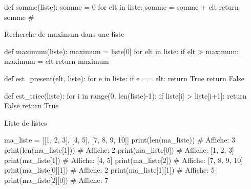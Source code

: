 \begin{minipage}{0.48\linewidth}
\begin{easybox}{}
		\begin{CodePythontexAlt}[Largeur=1\linewidth,Centre,PremLigne=1]{}
def somme(liste):
	somme = 0
	for elt in liste:
		somme = somme + elt
	return somme
#
		\end{CodePythontexAlt}
\end{easybox}
\end{minipage}\hfill
	\begin{minipage}{0.48\linewidth}
		\begin{easybox}{Recherche de maximum dans une liste}{}
	\begin{CodePythontexAlt}[Largeur=1\linewidth,Centre,PremLigne=1]{}
def maximum(liste):
	maximum = liste[0]
	for elt in liste:
		if elt > maximum:
			maximum = elt
	return maximum
\end{CodePythontexAlt}
	\end{easybox}
	\end{minipage}

	\begin{minipage}{0.48\linewidth}
\begin{easybox}{}
		\begin{CodePythontexAlt}[Largeur=1\linewidth,Centre,PremLigne=1]{}
def est_present(elt, liste):
	for e in liste:
		if e == elt:
			return True
	return False
		\end{CodePythontexAlt}
\end{easybox}
\end{minipage}\hfill
	\begin{minipage}{0.48\linewidth}
\begin{easybox}{}
		\begin{CodePythontexAlt}[Largeur=1\linewidth,Centre,PremLigne=1]{}
def est_triee(liste):
	for i in range(0, len(liste)-1):
		if liste[i] > liste[i+1]:
			return False
	return True
		\end{CodePythontexAlt}
\end{easybox}
\end{minipage}
			
\begin{easybox}{Liste de listes}{}

		\begin{CodePythontexAlt}[Largeur=1\linewidth,Centre,PremLigne=1]{}
ma_liste = [[1, 2, 3], [4, 5], [7, 8, 9, 10]]
print(len(ma_liste))	# Affiche: 3
print(len(ma_liste[1])) # Affiche: 2
print(ma_liste[0]) 		# Affiche: [1, 2, 3]
print(ma_liste[1])		# Affiche: [4, 5]
print(ma_liste[2])		# Affiche: [7, 8, 9, 10]
print(ma_liste[0][1]) 	# Affiche: 2
print(ma_liste[1][1]) 	# Affiche: 5
print(ma_liste[2][0]) 	# Affiche: 7
		\end{CodePythontexAlt}

		

\end{easybox}

